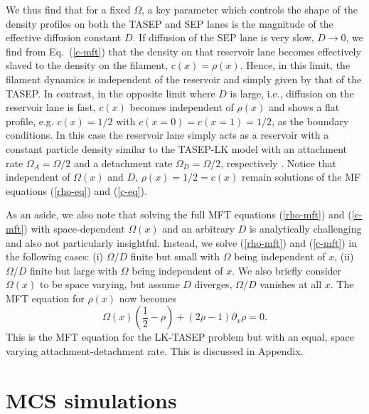 \documentclass[aps,pre,twocolumn,superscriptaddress,amsmath,amssymb,longbibliography,floatfix]{revtex4}
\begin{document}
We thus find that for a fixed $\Omega$, a key parameter which controls the shape of the density profiles on both the TASEP and SEP
lanes is the magnitude of the effective diffusion constant $D$. If diffusion
of the SEP lane is very slow, $D \to 0$, we find from Eq.~(\ref{c-mft}) that 
the density on that reservoir lane becomes effectively slaved to the density on the 
filament, $c(x)=\rho(x)$. Hence, in this limit, the filament dynamics is
independent of the reservoir and simply given by that of the TASEP. 
In contrast, in the opposite limit where $D$ is large, i.e., diffusion on
the reservoir lane is fast, $c(x)$ becomes independent of $\rho(x)$ and
shows a flat profile, e.g. $c(x)=1/2$ with $c(x=0)=c(x=1)=1/2$, as the boundary conditions. In this case the
reservoir lane simply acts as a reservoir with a constant particle density
similar to the TASEP-LK model with an attachment rate $\Omega_A = \Omega/2$
and a detachment rate $\Omega_D = \Omega/2$, respectively \cite{frey-lktasep}. Notice that independent of $\Omega(x)$ and $D$, $\rho(x)=1/2=c(x)$ remain solutions of the MF equations (\ref{rho-eq}) and (\ref{c-eq}).

As an aside, we also note that solving the full MFT equations (\ref{rho-mft}) and (\ref{c-mft}) with space-dependent $\Omega(x)$ and an arbitrary $D$ is analytically challenging and also not particularly insightful. Instead, we solve (\ref{rho-mft}) and (\ref{c-mft}) in the following cases: (i) $\Omega/D$ finite but small with $\Omega$ being independent of $x$, (ii) $\Omega/D$ finite but large with $\Omega$ being independent of $x$. We also briefly consider  $\Omega(x)$ to be space varying, but assume $D$ diverges, $\Omega/D$ vanishes at all $x$. The MFT equation for $\rho(x)$ now becomes
\begin{equation}
    \Omega(x)(\frac{1}{2}-\rho)+(2\rho-1)\partial_x\rho =0.\label{rho-mft-2}
\end{equation}
This is the MFT equation for the LK-TASEP problem but with an equal, space varying attachment-detachment rate. This is discussed in Appendix.

\section{MCS simulations}\label{mcs}
\end{document}
